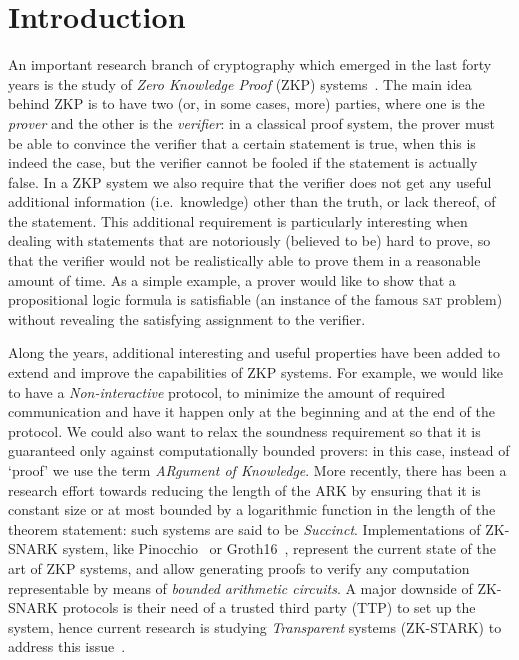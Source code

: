 \chapter{Introduction}
An important research branch of cryptography which emerged in the last forty years is the study of
\emph{Zero Knowledge Proof} (ZKP) systems~\cite{GoldwasserMR1989}.
The main idea behind ZKP is to have two (or, in some cases, more) parties, where 
one is the \emph{prover} and the other is the \emph{verifier}: in a classical proof system, the prover
must be able to convince the verifier that a certain statement is true, when this is indeed the case, 
but the verifier cannot be fooled if the statement is actually false.
In a ZKP system we also require that the verifier does not get any useful additional information 
(i.e.\ knowledge) other than the truth, or lack thereof, of the statement.
This additional requirement is particularly interesting when dealing with statements that are 
notoriously (believed to be) hard to prove, so that the verifier would not be realistically able to 
prove them in a reasonable amount of time.
As a simple example, a prover would like to show that a propositional logic formula is satisfiable 
(an instance of the famous \textsc{sat} problem) without revealing the satisfying assignment to the
verifier.  

Along the years, additional interesting and useful properties have been added to extend and improve 
the capabilities of ZKP systems.
For example, we would like to have a \emph{Non-interactive} protocol, to minimize the amount 
of required communication and have it happen only at the beginning and at the end of the protocol.
We could also want to relax the soundness requirement so that it is guaranteed only against 
computationally bounded provers: in this case, instead of `proof' we use the term 
\emph{ARgument of Knowledge}.
More recently, there has been a research effort towards reducing the length of the ARK by ensuring 
that it is constant size or at most bounded by a logarithmic function in the length of the theorem 
statement: such systems are said to be \emph{Succinct}. 
Implementations of ZK-SNARK system, like Pinocchio~\cite{ParnoGHR2013} or Groth16~\cite{Groth2016}, 
represent the current state of the art of ZKP systems, and allow generating proofs to verify any 
computation representable by means of \emph{bounded arithmetic circuits}.
A major downside of ZK-SNARK protocols is their need of a trusted third party (TTP) to set up the 
system, hence current research is studying \emph{Transparent} systems (ZK-STARK) to address this 
issue~\cite{SassonBHR2018}.

